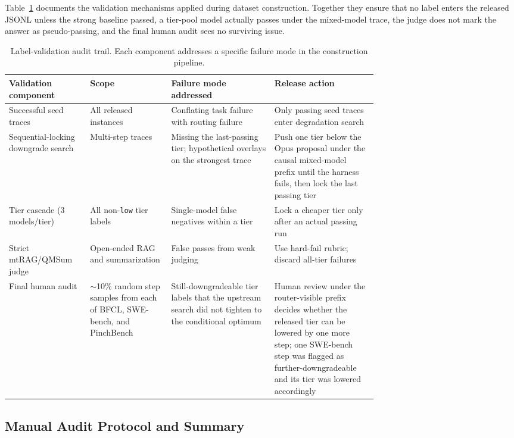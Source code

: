 Table~\ref{tab:appendix-validation} documents the validation mechanisms applied during dataset
construction. Together they ensure that no label enters the released JSONL unless the strong baseline
passed, a tier-pool model actually passes under the mixed-model trace, the judge does not mark
the answer as pseudo-passing, and the final human audit sees no surviving issue.

\begin{table}[ht]
\centering
\small
\caption{Label-validation audit trail. Each component addresses a specific failure mode
in the construction pipeline.}
\label{tab:appendix-validation}
\begin{tabularx}{\linewidth}{p{0.22\linewidth}p{0.22\linewidth}p{0.28\linewidth}X}
\toprule
Validation component & Scope & Failure mode addressed & Release action \\
\midrule
Successful seed traces &
  All released instances &
  Conflating task failure with routing failure &
  Only passing seed traces enter degradation search \\
Sequential-locking downgrade search &
  Multi-step traces &
  Missing the last-passing tier; hypothetical overlays on the strongest trace &
  Push one tier below the Opus proposal under the causal mixed-model prefix until the harness fails, then lock the last passing tier \\
Tier cascade (3 models/tier) &
  All non-\texttt{low} tier labels &
  Single-model false negatives within a tier &
  Lock a cheaper tier only after an actual passing run \\
Strict mtRAG/QMSum judge &
  Open-ended RAG and summarization &
  False passes from weak judging &
  Use hard-fail rubric; discard all-tier failures \\
Final human audit &
  $\sim$10\% random step samples from each of BFCL, SWE-bench, and PinchBench &
  Still-downgradeable tier labels that the upstream search did not tighten to the conditional optimum &
  Human review under the router-visible prefix decides whether the released tier can be lowered by one more step; one SWE-bench step was flagged as further-downgradeable and its tier was lowered accordingly \\
\bottomrule
\end{tabularx}
\end{table}

\subsection{Manual Audit Protocol and Summary}
\label{app:manual-audit}

